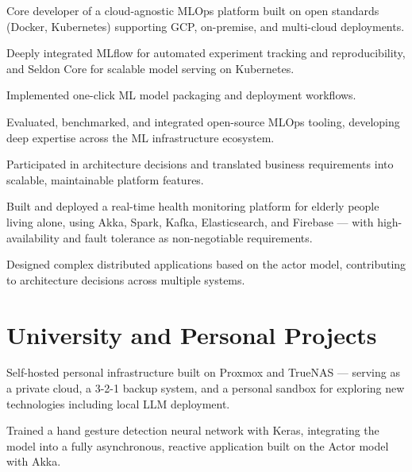 \documentclass[english]{plushcv}
\begin{document}
\begin{minipage}[t]{0.74\textwidth}
\hfill
{}
\vspace{5pt}
\begin{tightemize}
\sectionsep
\item Core developer of a cloud-agnostic MLOps platform built on open standards (Docker, Kubernetes) supporting GCP, on-premise, and multi-cloud deployments.
\item Deeply integrated MLflow for automated experiment tracking and reproducibility, and Seldon Core for scalable model serving on Kubernetes.
\item Implemented one-click ML model packaging and deployment workflows.
\item Evaluated, benchmarked, and integrated open-source MLOps tooling, developing deep expertise across the ML infrastructure ecosystem.
\item Participated in architecture decisions and translated business requirements into scalable, maintainable platform features.
\end{tightemize}
\sectionsep
\sectionsep

\hfill
{}
\vspace{5pt}
\begin{tightemize}
\sectionsep
\item Built and deployed a real-time health monitoring platform for elderly people living alone, using Akka, Spark, Kafka, Elasticsearch, and Firebase --- with high-availability and fault tolerance as non-negotiable requirements.
\item Designed complex distributed applications based on the actor model, contributing to architecture decisions across multiple systems.
\end{tightemize}

\section{University and Personal Projects}

\hfill
{}

Self-hosted personal infrastructure built on Proxmox and TrueNAS --- serving as a private cloud, a 3-2-1 backup system, and a personal sandbox for exploring new technologies including local LLM deployment.
\sectionsep
\sectionsep

\hfill
{}

Trained a hand gesture detection neural network with Keras, integrating the model into a fully asynchronous, reactive application built on the Actor model with Akka.

\end{minipage}
\end{document}

